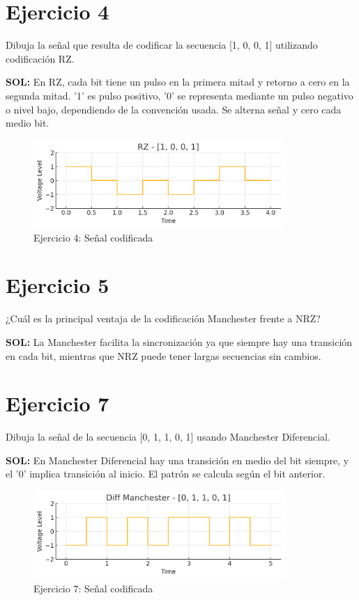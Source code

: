 \documentclass[a4paper,12pt]{article}
\begin{document}
\section*{Ejercicio 4}
Dibuja la señal que resulta de codificar la secuencia [1, 0, 0, 1] utilizando codificación RZ.



\textbf{SOL:} En RZ, cada bit tiene un pulso en la primera mitad y retorno a cero en la segunda mitad. '1' es pulso positivo, ’0’ se representa mediante un pulso negativo o nivel bajo, dependiendo de la convención usada. Se alterna señal y cero cada medio bit.

\begin{figure}[h!]
\centering
\includegraphics[width=0.85\textwidth]{img/ejercicio_4.png}
\caption{Ejercicio 4: Señal codificada}
\end{figure}
\clearpage


\section*{Ejercicio 5}
¿Cuál es la principal ventaja de la codificación Manchester frente a NRZ?



\textbf{SOL:} La Manchester facilita la sincronización ya que siempre hay una transición en cada bit, mientras que NRZ puede tener largas secuencias sin cambios.




\section*{Ejercicio 7}
Dibuja la señal de la secuencia [0, 1, 1, 0, 1] usando Manchester Diferencial.



\textbf{SOL:} En Manchester Diferencial hay una transición en medio del bit siempre, y el '0' implica transición al inicio. El patrón se calcula según el bit anterior.

\begin{figure}[h!]
\centering
\includegraphics[width=0.85\textwidth]{img/ejercicio_7.png}
\caption{Ejercicio 7: Señal codificada}
\end{figure}
\clearpage
\end{document}
